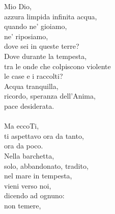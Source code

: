 \begin{haiku}
Mio Dio,\\
azzura limpida infinita acqua,\\
quando ne' gioiamo,\\
ne' riposiamo,\\
dove sei in queste terre?\\
Dove durante la tempesta,\\
tra le onde che colpiscono violente\\
le case e i raccolti?\\
Acqua tranquilla,\\
ricordo, speranza dell'Anima,\\
pace desiderata.\\
\leavevmode\\
Ma eccoTi,\\
ti aspettavo ora da tanto,\\
ora da poco.\\
Nella barchetta,\\
solo, abbandonato, tradito,\\
nel mare in tempesta,\\
vieni verso noi,\\
dicendo ad ognuno:\\
non temere,\\

\end{haiku}
